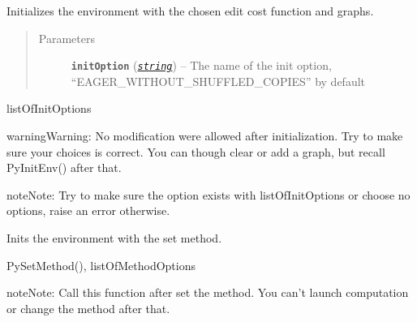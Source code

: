\documentclass[letterpaper,10pt,english]{sphinxmanual}
\begin{document}
\begin{fulllineitems}
\label{doc:PythonGedLib.PyInitEnv}
Initializes the environment with the chosen edit cost function and graphs.
\begin{quote}\begin{description}
\item[{Parameters}] \leavevmode
\textbf{\texttt{initOption}} (\href{https://docs.python.org/3/library/string.html\#module-string}{\emph{\texttt{string}}}) -- The name of the init option, ``EAGER\_WITHOUT\_SHUFFLED\_COPIES'' by default

\end{description}\end{quote}




listOfInitOptions



\begin{notice}{warning}{Warning:}
No modification were allowed after initialization. Try to make sure your choices is correct. You can though clear or add a graph, but recall PyInitEnv() after that.
\end{notice}

\begin{notice}{note}{Note:}
Try to make sure the option exists with listOfInitOptions or choose no options, raise an error otherwise.
\end{notice}

\end{fulllineitems}


\begin{fulllineitems}
\label{doc:PythonGedLib.PyInitMethod}
Inits the environment with the set method.




PySetMethod(), listOfMethodOptions



\begin{notice}{note}{Note:}
Call this function after set the method. You can't launch computation or change the method after that.
\end{notice}

\end{fulllineitems}
\end{document}
